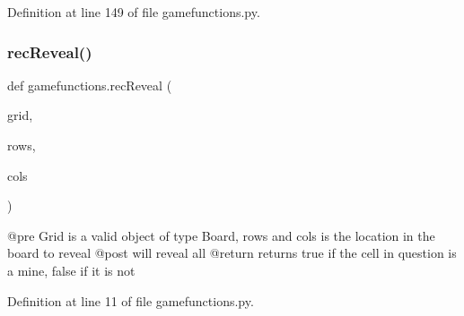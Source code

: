 Definition at line 149 of file gamefunctions.\+py.

\mbox{\label{namespacegamefunctions_a7d344c04c49594d58ba15b6673f9f8d9}} 
\subsubsection{\texorpdfstring{rec\+Reveal()}{recReveal()}}
{\footnotesize\ttfamily def gamefunctions.\+rec\+Reveal (\begin{DoxyParamCaption}\item[{}]{grid,  }\item[{}]{rows,  }\item[{}]{cols }\end{DoxyParamCaption})}

\begin{DoxyVerb}@pre    Grid is a valid object of type Board, rows and cols is the location in the board to reveal
    @post   will reveal all
    @return returns true if the cell in question is a mine, false if it is not
\end{DoxyVerb}
 

Definition at line 11 of file gamefunctions.\+py.

